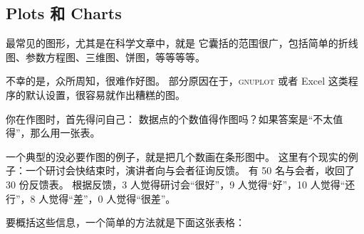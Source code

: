 \subsection{Plots 和 Charts}

\bohs

最常见的图形，尤其是在科学文章中，就是
它囊括的范围很广，包括简单的折线图、参数方程图、三维图、饼图，等等等等。

不幸的是，众所周知，很难作好图。
部分原因在于，\textsc{gnuplot} 或者 Excel 这类程序的默认设置，很容易就作出糟糕的图。

你在作图时，首先得问自己：
数据点的个数值得作图吗？如果答案是“不太值得”，那么用一张表。

一个典型的没必要作图的例子，就是把几个数画在条形图中。
这里有个现实的例子：一个研讨会快结束时，演讲者向与会者征询反馈。
有 50 名与会者，收回了 30 份反馈表。
根据反馈，3 人觉得研讨会“很好”，9 人觉得“好”，10 人觉得“还行”，8 人觉得“差”，0 人觉得“很差”。

要概括这些信息，一个简单的方法就是下面这张表格：

\eohs


